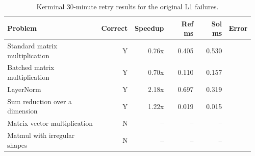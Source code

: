 \begin{table}[t]
\centering
\small
\caption{Kerminal 30-minute retry results for the original L1 failures.}
\label{tab:kerminal-retry}
\begin{tabular}{lrrrrr}
\toprule
Problem & Correct & Speedup & Ref ms & Sol ms & Error \\
\midrule
Standard matrix multiplication & Y & 0.76x & 0.405 & 0.530 &  \\
Batched matrix multiplication & Y & 0.70x & 0.110 & 0.157 &  \\
LayerNorm & Y & 2.18x & 0.697 & 0.319 &  \\
Sum reduction over a dimension & Y & 1.22x & 0.019 & 0.015 &  \\
Matrix vector multiplication & N & -- & -- & -- &  \\
Matmul with irregular shapes & N & -- & -- & -- &  \\
\bottomrule
\end{tabular}
\end{table}
